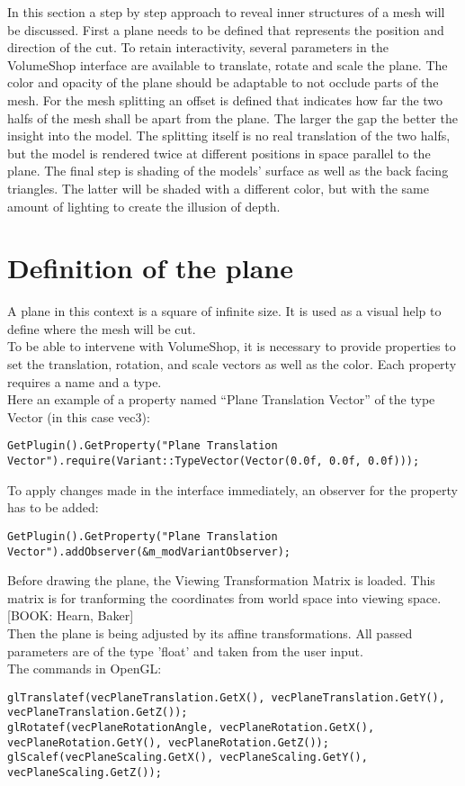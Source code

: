 
In this section a step by step approach to reveal inner structures of a mesh will be discussed. First a plane needs to be defined that represents the position and direction of the cut. To retain interactivity, several parameters in the VolumeShop interface are available to translate, rotate and scale the plane. The color and opacity of the plane should be adaptable to not occlude parts of the mesh. For the mesh splitting an offset is defined that indicates how far the two halfs of the mesh shall be apart from the plane. The larger the gap the better the insight into the model. The splitting itself is no real translation of the two halfs, but the model is rendered twice at different positions in space parallel to the plane. The final step is shading of the models' surface as well as the back facing triangles. The latter will be shaded with a different color, but with the same amount of lighting to create the illusion of depth.

\section{Definition of the plane}
\label{chap:planeDefinition}
A plane in this context is a square of infinite size. It is used as a visual help to define where the mesh will be cut.\\
To be able to intervene with VolumeShop, it is necessary to provide properties to set the translation, rotation, and scale vectors as well as the color.
Each property requires a name and a type.\\
Here an example of a property named "`Plane Translation Vector"' of the type Vector (in this case vec3):
\begin{lstlisting}
GetPlugin().GetProperty("Plane Translation Vector").require(Variant::TypeVector(Vector(0.0f, 0.0f, 0.0f)));
\end{lstlisting}

To apply changes made in the interface immediately, an observer for the property has to be added:
\begin{lstlisting}
GetPlugin().GetProperty("Plane Translation Vector").addObserver(&m_modVariantObserver);
\end{lstlisting}

Before drawing the plane, the Viewing Transformation Matrix is loaded. This matrix is for tranforming the coordinates from world space into viewing space.[BOOK: Hearn, Baker]\\
Then the plane is being adjusted by its affine transformations. All passed parameters are of the type 'float' and taken from the user input.\\
The commands in OpenGL:
\begin{lstlisting}
glTranslatef(vecPlaneTranslation.GetX(), vecPlaneTranslation.GetY(), vecPlaneTranslation.GetZ());
glRotatef(vecPlaneRotationAngle, vecPlaneRotation.GetX(), vecPlaneRotation.GetY(), vecPlaneRotation.GetZ());
glScalef(vecPlaneScaling.GetX(), vecPlaneScaling.GetY(), vecPlaneScaling.GetZ());
\end{lstlisting}

